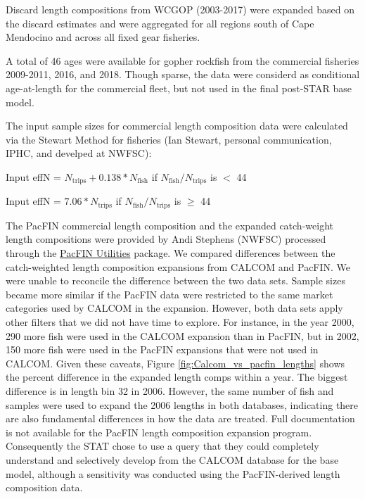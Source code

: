 \documentclass[12pt,]{article}
\begin{document}
Discard length compositions from WCGOP (2003-2017) were expanded based
on the discard estimates and were aggregated for all regions south of
Cape Mendocino and across all fixed gear fisheries.

A total of 46 ages were available for gopher rockfish from the
commercial fisheries 2009-2011, 2016, and 2018. Though sparse, the data
were considerd as conditional age-at-length for the commercial fleet,
but not used in the final post-STAR base model.

The input sample sizes for commercial length composition data were
calculated via the Stewart Method for fisheries (Ian Stewart, personal
communication, IPHC, and develped at NWFSC):

\begin{center}

Input effN = $N_{\text{trips}} + 0.138 * N_{\text{fish}}$ if $N_{\text{fish}}/N_{\text{trips}}$ is $<$ 44

Input effN = $7.06 * N_{\text{trips}}$ if $N_{\text{fish}}/N_{\text{trips}}$ is $\geq$ 44

\end{center}

The PacFIN commercial length composition and the expanded catch-weight
length compositions were provided by Andi Stephens (NWFSC) processed
through the
\href{https://github.com/nwfsc-assess/PacFIN.Utilities}{PacFIN
Utilities} package. We compared differences between the catch-weighted
length composition expansions from CALCOM and PacFIN. We were unable to
reconcile the difference between the two data sets. Sample sizes became
more similar if the PacFIN data were restricted to the same market
categories used by CALCOM in the expansion. However, both data sets
apply other filters that we did not have time to explore. For instance,
in the year 2000, 290 more fish were used in the CALCOM expansion than
in PacFIN, but in 2002, 150 more fish were used in the PacFIN expansions
that were not used in CALCOM. Given these caveats, Figure
\ref{fig:Calcom_vs_pacfin_lengths} shows the percent difference in the
expanded length comps within a year. The biggest difference is in length
bin 32 in 2006. However, the same number of fish and samples were used
to expand the 2006 lengths in both databases, indicating there are also
fundamental differences in how the data are treated. Full documentation
is not available for the PacFIN length composition expansion program.
Consequently the STAT chose to use a query that they could completely
understand and selectively develop from the CALCOM database for the base
model, although a sensitivity was conducted using the PacFIN-derived
length composition data.
\end{document}
